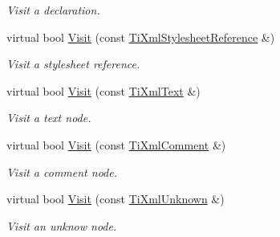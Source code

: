 \begin{DoxyCompactItemize}
\begin{DoxyCompactList}\small\item\em Visit a declaration. \item\end{DoxyCompactList}\item 
\hypertarget{class_ti_xml_visitor_aa039c9f2b52d9019fd5a725f82a350fa}{
virtual bool \hyperlink{class_ti_xml_visitor_aa039c9f2b52d9019fd5a725f82a350fa}{Visit} (const \hyperlink{class_ti_xml_stylesheet_reference}{TiXmlStylesheetReference} \&)}
\label{class_ti_xml_visitor_aa039c9f2b52d9019fd5a725f82a350fa}

\begin{DoxyCompactList}\small\item\em Visit a stylesheet reference. \item\end{DoxyCompactList}\item 
\hypertarget{class_ti_xml_visitor_a399b8ebca5cd14664974a32d2ce029e5}{
virtual bool \hyperlink{class_ti_xml_visitor_a399b8ebca5cd14664974a32d2ce029e5}{Visit} (const \hyperlink{class_ti_xml_text}{TiXmlText} \&)}
\label{class_ti_xml_visitor_a399b8ebca5cd14664974a32d2ce029e5}

\begin{DoxyCompactList}\small\item\em Visit a text node. \item\end{DoxyCompactList}\item 
\hypertarget{class_ti_xml_visitor_a53a60e7a528627b31af3161972cc7fa2}{
virtual bool \hyperlink{class_ti_xml_visitor_a53a60e7a528627b31af3161972cc7fa2}{Visit} (const \hyperlink{class_ti_xml_comment}{TiXmlComment} \&)}
\label{class_ti_xml_visitor_a53a60e7a528627b31af3161972cc7fa2}

\begin{DoxyCompactList}\small\item\em Visit a comment node. \item\end{DoxyCompactList}\item 
\hypertarget{class_ti_xml_visitor_a7e284d607d275c51dac1adb58159ce28}{
virtual bool \hyperlink{class_ti_xml_visitor_a7e284d607d275c51dac1adb58159ce28}{Visit} (const \hyperlink{class_ti_xml_unknown}{TiXmlUnknown} \&)}
\label{class_ti_xml_visitor_a7e284d607d275c51dac1adb58159ce28}

\begin{DoxyCompactList}\small\item\em Visit an unknow node. \item\end{DoxyCompactList}\end{DoxyCompactItemize}


